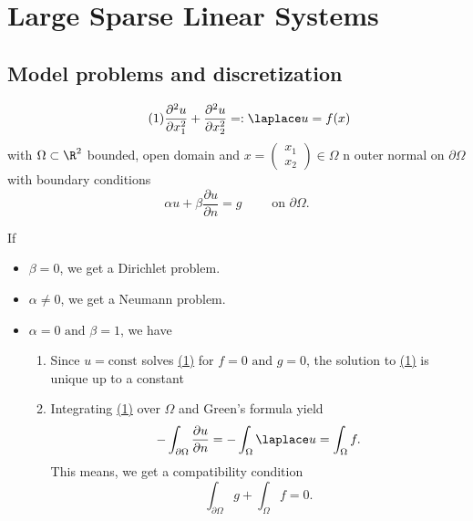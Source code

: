 
\chapter{Large Sparse Linear Systems}
\section{Model problems and discretization}%
\label{sec:Modelproblems and discretization}


\begin{equation}\label{eq:eq_1}\tag{1}
	\frac{\partial^2 u}{\partial x_1^2} + \frac{\partial^2 u}{\partial x_2^2} =: \laplace u = f(x) 
\end{equation}
with $\Omega \subset \R^2$ bounded, open domain and 
$ x =
\begin{pmatrix}
x_1 \\
x_2
\end{pmatrix}
\in \Omega$
%
n outer normal on $\partial \Omega$
with boundary conditions
\[
\alpha u + \beta \frac{\partial u}{\partial n} = g \qquad \text{ on } \partial \Omega
.\] 

If \begin{itemize}
	\item $ \beta = 0$, we get a Dirichlet problem.
	\item $ \alpha \neq 0$, we get a Neumann problem.
	\item $\alpha = 0 \text{ and } \beta = 1$, we have
		\begin{enumerate}
			\item Since $u = \text{const}$ solves \href{eq:eq_1}{(1)} %
				for $f=0 \text{ and } g = 0$, the solution to \href{eq:eq_1}{(1)} is unique up to a constant
			\item Integrating \href{eq:eq_1}{(1)} over $\Omega$ and Green's formula yield
				\[
				- \int_{\partial\Omega} \frac{\partial u}{\partial n} = - \int_{\Omega} \laplace u = \int_{\Omega} f
				.\] 
				This means, we get a compatibility condition
				\[
				\int_{\partial \Omega} g + \int_{\Omega}f = 0
				.\] 
		\end{enumerate}
\end{itemize} 

